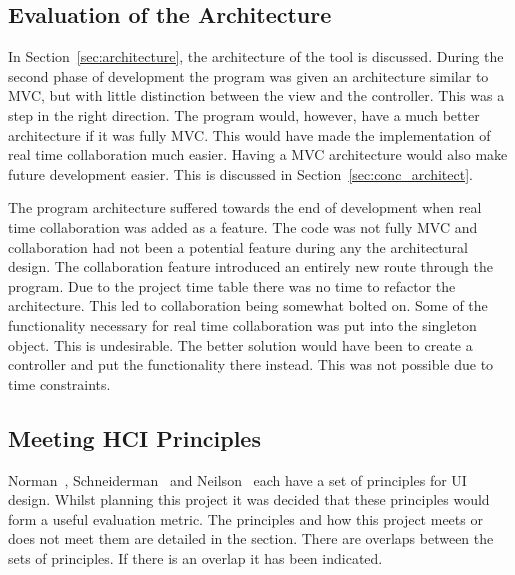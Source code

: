 \subsection{Evaluation of the Architecture}

In Section~\ref{sec:architecture}, the architecture of the tool is discussed.  During the second phase of development the program was given an architecture similar to \ac{MVC}, but with little distinction between the view and the controller.  This was a step in the right direction.  The program would, however, have a much better architecture if it was fully \ac{MVC}.  This would have made the implementation of real time collaboration much easier. Having a \ac{MVC} architecture would also make future development easier.  This is discussed in Section~\ref{sec:conc_architect}.

The program architecture suffered towards the end of development when real time collaboration was added as a feature.  The code was not fully \ac{MVC} and collaboration had not been a potential feature during any the architectural design.  The collaboration feature introduced an entirely new route through the program.  Due to the project time table there was no time to refactor the architecture.  This led to collaboration being somewhat bolted on.  Some of the functionality necessary for real time collaboration was put into the singleton object.  This is undesirable.  The better solution would have been to create a controller and put the functionality there instead.  This was not possible due to time constraints.

\subsection{Meeting HCI Principles}

Norman~\cite{normsev}, Schneiderman~\cite{shgold} and Neilson~\cite{neilten} each have a set of principles for \ac{UI} design.  Whilst planning this project it was decided that these principles would form a useful evaluation metric.  The principles and how this project meets or does not meet them are detailed in the section.  There are overlaps between the sets of principles.  If there is an overlap it has been indicated.


